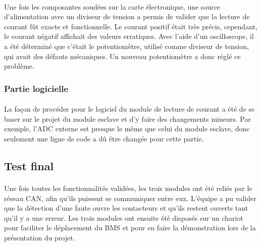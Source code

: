 			\paragraph{}
			Une fois les composantes soudées sur la carte électronique, une source d’alimentation avec un diviseur de tension a permis de valider que la lecture de courant fût exacte et fonctionnelle. Le courant positif était très précis, cependant, le courant négatif affichait des valeurs erratiques. Avec l'aide d'un oscilloscope, il a été déterminé que c’était le potentiomètre, utilisé comme diviseur de tension, qui avait des défauts mécaniques. Un nouveau potentiomètre a donc réglé ce problème.

		\subsubsection{Partie logicielle}

			\paragraph{}
			La façon de procéder pour le logiciel du module de lecture de courant a été de se baser sur le projet du module esclave et d'y faire des changements mineurs. Par exemple, l'ADC externe est presque le même que celui du module esclave, donc seulement une ligne de code a dû être changée pour cette partie.

	\subsection{Test final}

		\paragraph{}
		Une fois toutes les fonctionnalités validées, les trois modules ont été reliés par le réseau CAN, afin qu’ils puissent se communiquer entre eux. L’équipe a pu valider que la détection d’une faute ouvre les contacteurs et qu’ils restent ouverts tant qu’il y a une erreur. Les trois modules ont ensuite été disposés sur un chariot pour faciliter le déplacement du BMS et pour en faire la démonstration lors de la présentation du projet.

